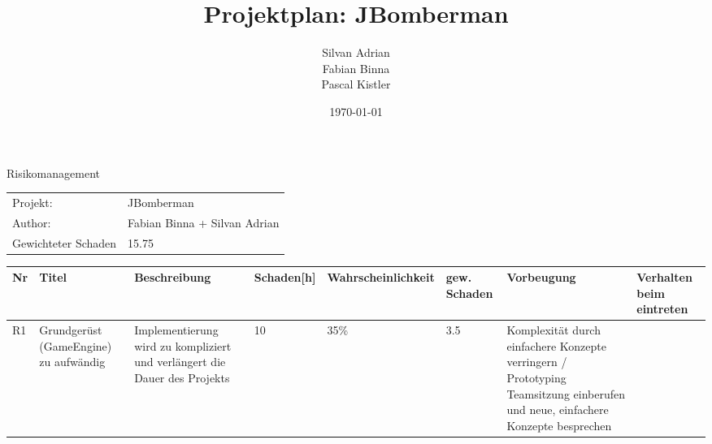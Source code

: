 \documentclass[landscape,10pt]{scrartcl}
\title{Projektplan: JBomberman}
\author{Silvan Adrian \\ Fabian Binna \\ Pascal Kistler}
\date{\today{}}
\begin{document}
 {\large{Risikomanagement}}
 
   \begin{tabular}{l l }
     Projekt: & JBomberman \\
     Author: & Fabian Binna + Silvan Adrian \\
     Gewichteter Schaden & 15.75
   \end{tabular}
  
 \begin{table}[h]
\begin{tabularx}{\textwidth}{l X X l l l X X}
\textbf{Nr} & \textbf{Titel} & \textbf{Beschreibung}  & 
\textbf{Schaden[h]} & \textbf{Wahrscheinlichkeit} & 
\textbf{gew. Schaden} & \textbf{Vorbeugung} &
 \textbf{Verhalten beim eintreten} \\
\hline
R1 & Grundgerüst (GameEngine) zu aufwändig & Implementierung 
wird zu  kompliziert 
und verlängert die Dauer des Projekts & 10 & 35\%
& 3.5 & Komplexität durch einfachere Konzepte verringern / Prototyping
Teamsitzung einberufen und neue, 
einfachere Konzepte besprechen
\end{tabularx}
\end{table}
\end{document}
